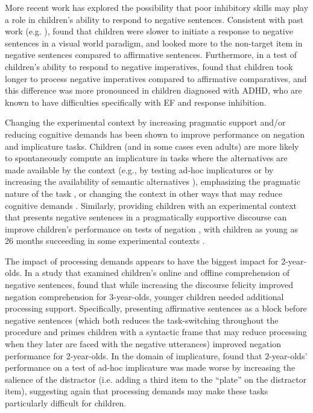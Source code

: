 \documentclass[man, noapacite]{apa2}
\begin{document}
More recent work has explored the possibility that poor inhibitory skills may play a role in children's ability to respond to negative sentences. Consistent with past work (e.g. ),  found that children were slower to initiate a response to negative sentences in a visual world paradigm, and looked more to the non-target item in negative sentences compared to affirmative sentences. Furthermore, in a test of children's ability to respond to negative imperatives,  found that children took longer to process negative imperatives compared to affirmative comparatives, and this difference was more pronounced in children diagnosed with ADHD, who are known to have difficulties specifically with EF and response inhibition.  

Changing the experimental context by increasing pragmatic support and/or reducing cognitive demands has been shown to improve performance on negation and implicature tasks. Children (and in some cases even adults) are more likely to spontaneously compute an implicature in tasks where the alternatives are made available by the context (e.g., by testing ad-hoc implicatures \cite{stiller2015, horowitz2018} or by increasing the availability of semantic alternatives \cite{skordos2016}), emphasizing the pragmatic nature of the task \cite{guasti2005, skordos2016}, or changing the context in other ways that may reduce cognitive demands \cite{pouscoulous2007}. Similarly, providing children with an experimental context that presents negative sentences in a pragmatically supportive discourse can improve children's performance on tests of negation \cite{nordmeyer2014b, reuter2018}, with children as young as 26 months succeeding in some experimental contexts \cite{austin2014, feiman2017}. 

The impact of processing demands appears to have the biggest impact for 2-year-olds. In a study that examined children's online and offline comprehension of negative sentences,  found that while increasing the discourse felicity improved negation comprehension for 3-year-olds, younger children needed additional processing support. Specifically, presenting affirmative sentences as a block before negative sentences (which both reduces the task-switching throughout the procedure and primes children with a syntactic frame that may reduce processing when they later are faced with the negative utterances) improved negation performance for 2-year-olds. In the domain of implicature,  found that 2-year-olds' performance on a test of ad-hoc implicature was made worse by increasing the salience of the distractor (i.e. adding a third item to the ``plate'' on the distractor item), suggesting again that processing demands may make these tasks particularly difficult for children. 
\end{document}
